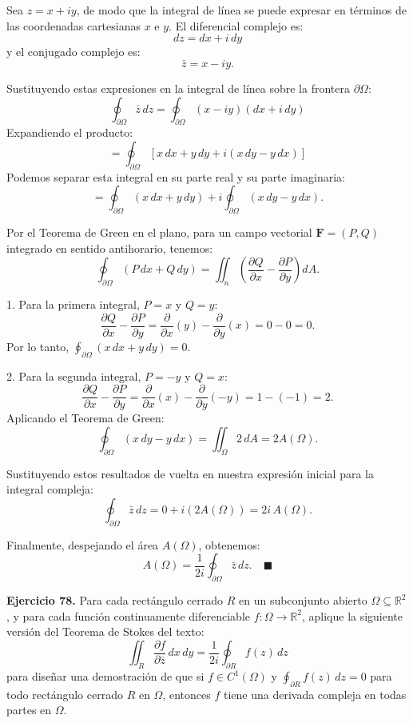 \documentclass[11pt,a4paper]{article}
\theoremstyle{definition}
\theoremstyle{plain}
\theoremstyle{remark}
\begin{document}
	Sea $z = x + iy$, de modo que la integral de línea se puede expresar en términos de las coordenadas cartesianas $x$ e $y$. El diferencial complejo es:
	\[
	dz = dx + i\,dy
	\]
	y el conjugado complejo es:
	\[
	\bar{z} = x - iy.
	\]
	
	Sustituyendo estas expresiones en la integral de línea sobre la frontera $\partial\Omega$:
	\[
	\oint_{\partial\Omega} \bar{z} \, dz = \oint_{\partial\Omega} (x - iy)(dx + i\,dy)
	\]
	Expandiendo el producto:
	\[
	= \oint_{\partial\Omega} \left[ x\,dx + y\,dy + i(x\,dy - y\,dx) \right]
	\]
	Podemos separar esta integral en su parte real y su parte imaginaria:
	\[
	= \oint_{\partial\Omega} (x\,dx + y\,dy) + i \oint_{\partial\Omega} (x\,dy - y\,dx).
	\]
	
	Por el Teorema de Green en el plano, para un campo vectorial $\mathbf{F} = (P, Q)$ integrado en sentido antihorario, tenemos:
	\[
	\oint_{\partial\Omega} (P\,dx + Q\,dy) = \iint_n \left( \frac{\partial Q}{\partial x} - \frac{\partial P}{\partial y} \right) dA.
	\]
	
	1. Para la primera integral, $P = x$ y $Q = y$:
	\[
	\frac{\partial Q}{\partial x} - \frac{\partial P}{\partial y} = \frac{\partial}{\partial x}(y) - \frac{\partial}{\partial y}(x) = 0 - 0 = 0.
	\]
	Por lo tanto, $\oint_{\partial\Omega} (x\,dx + y\,dy) = 0$.
	
	2. Para la segunda integral, $P = -y$ y $Q = x$:
	\[
	\frac{\partial Q}{\partial x} - \frac{\partial P}{\partial y} = \frac{\partial}{\partial x}(x) - \frac{\partial}{\partial y}(-y) = 1 - (-1) = 2.
	\]
	Aplicando el Teorema de Green:
	\[
	\oint_{\partial\Omega} (x\,dy - y\,dx) = \iint_{\Omega} 2 \, dA = 2 A(\Omega).
	\]
	
	Sustituyendo estos resultados de vuelta en nuestra expresión inicial para la integral compleja:
	\[
	\oint_{\partial\Omega} \bar{z} \, dz = 0 + i \left( 2 A(\Omega) \right) = 2i \, A(\Omega).
	\]
	
	Finalmente, despejando el área $A(\Omega)$, obtenemos:
	\[
	A(\Omega) = \frac{1}{2i} \oint_{\partial\Omega} \bar{z} \, dz. \quad \blacksquare
	\]
	
	\noindent \textbf{Ejercicio 78.} Para cada rectángulo cerrado $R$ en un subconjunto abierto $\Omega \subseteq \mathbb{R}^2$, y para cada función continuamente diferenciable $f : \Omega \to \mathbb{R}^2$, aplique la siguiente versión del Teorema de Stokes del texto:
	\[
	\iint_{R} \frac{\partial f}{\partial \bar{z}} \, dx \, dy = \frac{1}{2i} \oint_{\partial R} f(z) \, dz
	\]
	para diseñar una demostración de que si $f \in C^1(\Omega)$ y $\oint_{\partial R} f(z) \, dz = 0$ para todo rectángulo cerrado $R$ en $\Omega$, entonces $f$ tiene una derivada compleja en todas partes en $\Omega$.
	
\end{document}
